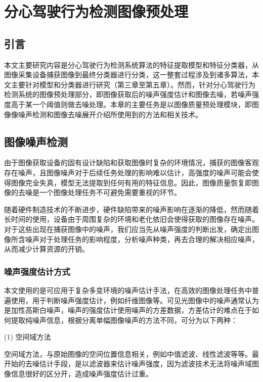 \chapter{分心驾驶行为检测图像预处理}

\section{引言}

本文主要研究内容是分心驾驶行为检测系统算法的特征提取模型和特征分类器，从图像采集设备捕获图像到最终分类器进行分类，这一整套过程涉及到诸多算法，本文主要针对模型和分类器进行研究（第三章至第五章）。然而，针对分心驾驶行为检测系统的图像预处理部分，即图像获取后的噪声强度估计和图像去噪，若噪声强度高于某一个阈值则做去噪处理。本章的主要任务是以图像质量预处理模块，即图像像噪声检测和图像去噪展开介绍所使用到的方法和相关技术。

\section{图像噪声检测}

由于图像获取设备的固有设计缺陷和获取图像时复杂的环境情况，捕获的图像客观存在噪声，且图像噪声对于后续任务处理的影响难以估计，高强度的噪声可能会使得图像完全失真，模型无法提取到任何有用的特征信息。因此，图像质量恢复即图像的去噪是一个图像处理任务不可避免需要重视的环节。

随着硬件制造技术的不断进步，硬件缺陷带来的噪声影响在逐渐的降低，然而随着长时间的使用，设备由于周围复杂的环境和老化依旧会使得获取的图像存在噪声。对于这些出现在捕获图像中的噪声，我们应当先从噪声强度的判断出发，确定出图像所含噪声对于处理任务的影响程度，分析噪声种类，再去合理的解决相应噪声，从而减少计算资源的开销。

\subsection{噪声强度估计方式}

本文使用的是可应用于复杂多变环境的噪声估计手法，在高效的图像处理任务中普遍使用，用于判断噪声强度估计，例如纤维图像等。可见光图像中的噪声通常认为是加性高斯白噪声，噪声的强度估计使用噪声的方差数据，方差估计的难点在于如何提取纯噪声信息，根据分离单幅图像噪声的方法不同，可分为以下两种：

(1)	空间域方法

空间域方法，与原始图像的空间位置信息相关，例如中值滤波、线性滤波等等。最开始的去噪估计手段，是以滤波器来估计噪声强度，因为滤波技术无法将噪声域图像信息很好的区分开，造成噪声强度估计过重。


